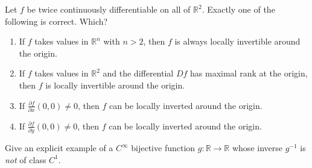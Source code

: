 \begin{exercise}
\label{ex:kobel_ift_single_choice}
Let $f$ be twice continuously differentiable on all of $\mathbb{R}^2$. Exactly one of the
following is correct. Which?
\begin{enumerate}[label=\textbf{(\alph*)}]
  \item If $f$ takes values in $\mathbb{R}^n$ with $n > 2$, then $f$ is always locally invertible
    around the origin.
  \item If $f$ takes values in $\mathbb{R}^2$ and the differential $Df$ has maximal rank at the
    origin, then $f$ is locally invertible around the origin.
  \item If $\frac{\partial f}{\partial x}(0,0) \neq 0$, then $f$ can be locally inverted around the
    origin.
  \item If $\frac{\partial f}{\partial y}(0,0) \neq 0$, then $f$ can be locally inverted around the
    origin.
\end{enumerate}
\end{exercise}

\begin{exercise}
\label{ex:box_smooth_bijection_rough_inverse}
Give an explicit example of a $C^\infty$ bijective function $g : \mathbb{R} \to \mathbb{R}$ whose
inverse $g^{-1}$ is \emph{not} of class $C^1$.
\end{exercise}

